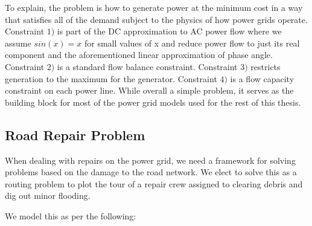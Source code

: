 \documentclass{article}
\begin{document}
To explain, the problem is how to generate power at the minimum cost in a way that satisfies all of the demand subject to the physics of how power grids operate. Constraint $1)$ is part of the DC approximation to AC power flow where we assume $sin(x) = x$ for small values of x and reduce power flow to just its real component and the aforementioned linear approximation of phase angle. Constraint $2)$ is a standard flow balance constraint. Constraint $3)$ restricts generation to the maximum for the generator. Constraint $4)$ is a flow capacity constraint on each power line. While overall a simple problem, it serves as the building block for most of the power grid models used for the rest of this thesis.
	
	
	\subsection{Road Repair Problem}
	When dealing with repairs on the power grid, we need a framework for solving problems based on the damage to the road network. We elect to solve this as a routing problem to plot the tour of a repair crew assigned to clearing debris and dig out minor flooding. 
	
	We model this as per the following:
	
\end{document}
